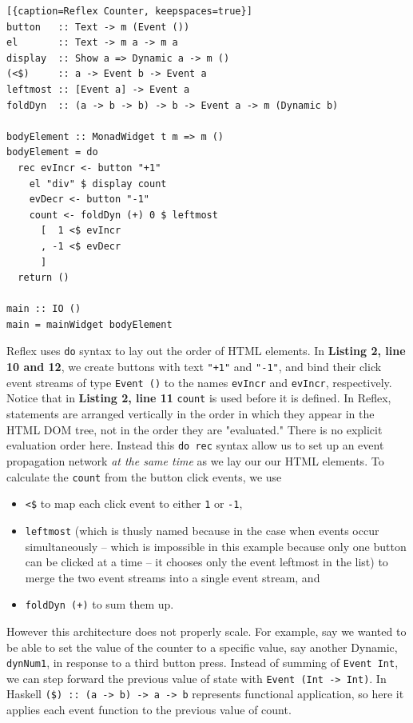 \documentclass[sigconf]{acmart}
\begin{document}
\begin{lstlisting}[{caption=Reflex Counter, keepspaces=true}]
button   :: Text -> m (Event ())
el       :: Text -> m a -> m a
display  :: Show a => Dynamic a -> m ()
(<$)     :: a -> Event b -> Event a
leftmost :: [Event a] -> Event a
foldDyn  :: (a -> b -> b) -> b -> Event a -> m (Dynamic b)

bodyElement :: MonadWidget t m => m ()
bodyElement = do
  rec evIncr <- button "+1"
    el "div" $ display count
    evDecr <- button "-1"
    count <- foldDyn (+) 0 $ leftmost 
      [  1 <$ evIncr
      , -1 <$ evDecr
      ]
  return ()
  
main :: IO ()
main = mainWidget bodyElement
\end{lstlisting}

Reflex uses \lstinline{do} syntax to lay out the order of HTML elements. In \textbf{Listing 2, line 10 and 12}, we create buttons with text \lstinline{"+1"} and \lstinline{"-1"}, and bind their click event streams of type \lstinline{Event ()} to the names \lstinline{evIncr} and \lstinline{evIncr}, respectively. Notice that in \textbf{Listing 2, line 11} \lstinline{count} is used before it is defined. In Reflex, statements are arranged vertically in the order in which they appear in the HTML DOM tree, not in the order they are "evaluated." There is no explicit evaluation order here. Instead this \lstinline{do rec} syntax allow us to set up an event propagation network \textit{at the same time} as we lay our our HTML elements. To calculate the \lstinline{count} from the button click events, we use

\begin{itemize}
\item \lstinline{<$} to map each click event to either \lstinline{1} or \lstinline{-1}, 
\item \lstinline{leftmost} (which is thusly named because in the case when events occur simultaneously -- which is impossible in this example because only one button can be clicked at a time -- it chooses only the event leftmost in the list) to merge the two event streams into a single event stream, and
\item  \lstinline{foldDyn (+)} to sum them up. 
\end{itemize}

However this architecture does not properly scale. For example, say we wanted to be able to set the value of the counter to a specific value, say another Dynamic, \lstinline{dynNum1}, in response to a third button press. Instead of summing of \lstinline{Event Int}, we can step forward the previous value of state with \lstinline{Event (Int -> Int)}. In Haskell \lstinline{($) :: (a -> b) -> a -> b} represents functional application, so here it applies each event function to the previous value of count.
\end{document}

